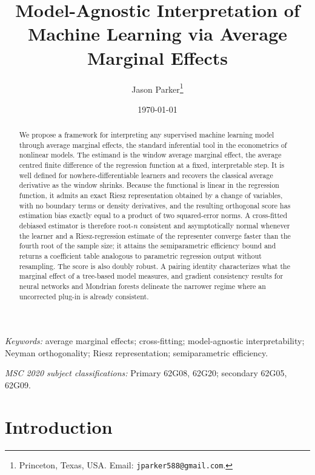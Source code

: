 \documentclass[12pt,a4paper]{article}
\numberwithin{equation}{section}
\theoremstyle{plain}
\theoremstyle{definition}
\begin{document}
\title{Model-Agnostic Interpretation of Machine Learning via Average
Marginal Effects}
\author{Jason Parker\thanks{Princeton, Texas, USA. Email:
\texttt{jparker588@gmail.com}.}}
\date{\today}
\maketitle

\begin{abstract}
\noindent We propose a framework for interpreting any supervised machine
learning model through average marginal effects, the standard inferential tool
in the econometrics of nonlinear models. The estimand is the window average
marginal effect, the average centred finite difference of the regression
function at a fixed, interpretable step. It is well defined for
nowhere-differentiable learners and recovers the classical average derivative as
the window shrinks. Because the functional is linear in the regression function,
it admits an exact Riesz representation obtained by a change of variables, with
no boundary terms or density derivatives, and the resulting orthogonal score
has estimation bias exactly equal to a product of two squared-error norms.
A cross-fitted debiased estimator is therefore root-$n$ consistent and
asymptotically normal whenever the learner and a Riesz-regression estimate of
the representer converge faster than the fourth root of the sample size; it
attains the semiparametric efficiency bound and returns a coefficient table
analogous to parametric regression output without resampling. The score is also
doubly robust. A pairing identity characterizes what the marginal effect of a
tree-based model measures, and gradient consistency results for neural
networks and Mondrian forests delineate the narrower regime where an
uncorrected plug-in is already consistent.
\end{abstract}

\medskip
\noindent\textit{Keywords:} average marginal effects; cross-fitting;
model-agnostic interpretability; Neyman orthogonality; Riesz
representation; semiparametric efficiency.

\medskip
\noindent\textit{MSC 2020 subject classifications:} Primary 62G08,
62G20; secondary 62G05, 62G09.

\newpage

	\section{Introduction}
	
\end{document}
